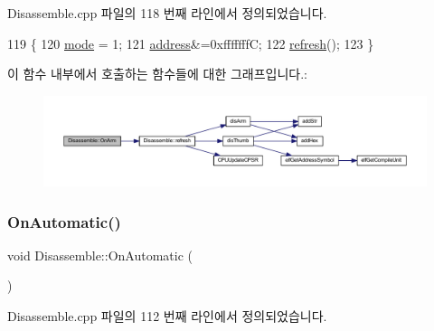 Disassemble.\+cpp 파일의 118 번째 라인에서 정의되었습니다.


\begin{DoxyCode}
119 \{
120   \mbox{\hyperlink{class_disassemble_a30b707e1da3b01abda044e78929404cc}{mode}} = 1;
121   \mbox{\hyperlink{class_disassemble_a960ac8317ada7182e59132a3ee4afb48}{address}}&=0xfffffffC;
122   \mbox{\hyperlink{class_disassemble_a7cdf11d53ce0f170ad7dd8fc66961805}{refresh}}();
123 \}
\end{DoxyCode}
이 함수 내부에서 호출하는 함수들에 대한 그래프입니다.\+:
\nopagebreak
\begin{figure}[H]
\begin{center}
\leavevmode
\includegraphics[width=350pt]{class_disassemble_a11695fe0ce9003a5cfcd58e86ad6047e_cgraph}
\end{center}
\end{figure}
\mbox{\label{class_disassemble_a713e75749b5c7c79927075b57431a298}} 
\subsubsection{\texorpdfstring{On\+Automatic()}{OnAutomatic()}}
{\footnotesize\ttfamily void Disassemble\+::\+On\+Automatic (\begin{DoxyParamCaption}{ }\end{DoxyParamCaption})\hspace{0.3cm}{\ttfamily [protected]}}



Disassemble.\+cpp 파일의 112 번째 라인에서 정의되었습니다.


